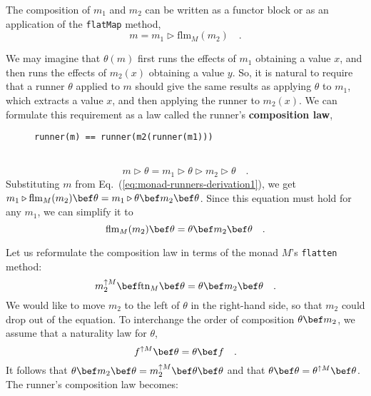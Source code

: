 \noindent The composition of $m_{1}$ and $m_{2}$ can be written
as a functor block or as an application of the \lstinline!flatMap!
method,
\begin{equation}
m=m_{1}\triangleright\text{flm}_{M}(m_{2})\quad.\label{eq:monad-runners-derivation1}
\end{equation}
\vspace{-1.2\baselineskip}

We may imagine that $\theta\left(m\right)$ first runs the effects
of $m_{1}$ obtaining a value $x$, and then runs the effects of $m_{2}(x)$
obtaining a value $y$. So, it is natural to require that a runner
$\theta$ applied to $m$ should give the same results as applying
$\theta$ to $m_{1}$, which extracts a value $x$, and then applying
the runner to $m_{2}(x)$. We can formulate this requirement as a
law called the runner\textsf{'}s \textbf{composition
law},

\begin{wrapfigure}{l}{0.4\columnwidth}%
\vspace{-0.85\baselineskip}

\begin{lstlisting}
runner(m) == runner(m2(runner(m1)))
\end{lstlisting}
\vspace{-0.7\baselineskip}
\end{wrapfigure}%

~\vspace{-0.4\baselineskip}
\[
m\triangleright\theta=m_{1}\triangleright\theta\triangleright m_{2}\triangleright\theta\quad.
\]
Substituting $m$ from Eq.~(\ref{eq:monad-runners-derivation1}),
we get $m_{1}\triangleright\text{flm}_{M}(m_{2})\bef\theta=m_{1}\triangleright\theta\bef m_{2}\bef\theta$.
Since this equation must hold for any $m_{1}$, we can simplify it
to
\[
\text{flm}_{M}(m_{2})\bef\theta=\theta\bef m_{2}\bef\theta\quad.
\]

Let us reformulate the composition law in terms of the monad $M$\textsf{'}s
\lstinline!flatten! method:
\[
m_{2}^{\uparrow M}\bef\text{ftn}_{M}\bef\theta=\theta\bef m_{2}\bef\theta\quad.
\]
We would like to move $m_{2}$ to the left of $\theta$ in the right-hand
side, so that $m_{2}$ could drop out of the equation. To interchange
the order of composition $\theta\bef m_{2}$, we assume that a naturality
law for $\theta$,
\begin{equation}
f^{\uparrow M}\bef\theta=\theta\bef f\quad.\label{eq:runner-naturality-law}
\end{equation}
It follows that $\theta\bef m_{2}\bef\theta=m_{2}^{\uparrow M}\bef\theta\bef\theta$
and that $\theta\bef\theta=\theta^{\uparrow M}\bef\theta$. The runner\textsf{'}s
composition law becomes:

